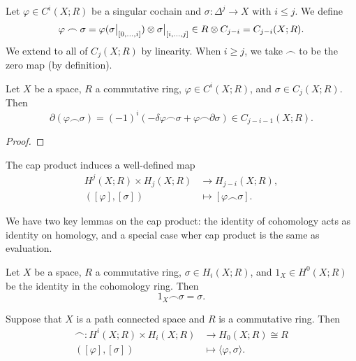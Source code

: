 \begin{definition}
    Let $\varphi \in C^i(X;R)$ be a singular cochain and $\sigma: \Delta^j \to X$ with $i \leq j$. We define
    \[ \varphi \frown \sigma = \varphi(\restr{\sigma}{[0, \ldots, i]}) \otimes \restr{\sigma}{[i, \ldots, j]} \in R \otimes C_{j - i} = C_{j-i}(X;R). \]
    We extend to all of $C_j(X;R)$ by linearity. When $i \geq j$, we take ${\frown}$ to be the zero map (by definition).
\end{definition}

\begin{lemma}
    Let $X$ be a space, $R$ a commutative ring, $\varphi \in C^i(X;R)$, and $\sigma \in C_j(X;R)$. Then
    \[ \partial(\varphi \frown \sigma) = (-1)^i(-\delta\varphi \frown \sigma + \varphi \frown \partial\sigma) \in C_{j - i - 1}(X;R). \]
\end{lemma}

\begin{proof}
\end{proof}

\begin{lemma}
    The cap product induces a well-defined map
    \begin{align*}
        H^j(X;R) \times H_j(X;R) & \to H_{j-i}(X;R) ,               \\
        ([\varphi], [\sigma])    & \mapsto [\varphi \frown \sigma].
    \end{align*}
\end{lemma}

We have two key lemmas on the cap product: the identity of cohomology acts as identity on homology, and a special case wher cap product is the same as evaluation.

\begin{lemma}
    Let $X$ be a space, $R$ a commutative ring, $\sigma \in H_i(X;R)$, and $1_X \in H^0(X;R)$ be the identity in the cohomology ring. Then
    \[ 1_X \frown \sigma = \sigma. \]
\end{lemma}

\begin{lemma}
    Suppose that $X$ is a path connected space and $R$ is a commutative ring. Then
    \begin{align*}
        {\frown}: H^i(X;R) \times H_i(X;R) &\to H_0(X; R) \cong R \\
        ([\varphi], [\sigma]) &\mapsto \langle \varphi, \sigma \rangle.
    \end{align*}
\end{lemma}

